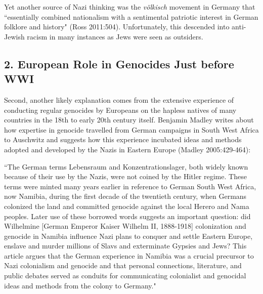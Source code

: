 Yet another source of Nazi thinking was the {\sl völkisch} movement in Germany that ``essentially combined nationalism with a sentimental patriotic interest in German folklore and history" (Ross 2011:504). Unfortunately, this descended into anti-Jewish racism in many instances as Jews were seen as outsiders.
\vskip -20pt

\subsection*{2. European Role in Genocides Just before WWI}
\vskip -4pt

Second, another likely explanation comes from the extensive experience of conducting regular genocides by Europeans on the hapless natives of many countries in the 18th to early 20th century itself. Benjamin Madley writes about how expertise in genocide travelled from German campaigns in South West Africa to Auschwitz and suggests how this experience incubated ideas and methods adopted and developed by the Nazis in Eastern Europe (Madley 2005:429-464):

\begin{myquote}
``The German terms Lebensraum and Konzentrationslager, both widely known because of their use by the Nazis, were not coined by the Hitler regime. These terms were minted many years earlier in reference to German South West Africa, now Namibia, during the first decade of the twentieth century, when Germans colonized the land and committed genocide against the local Herero and Nama peoples. Later use of these borrowed words suggests an important question: did Wilhelmine [German Emperor Kaiser Wilhelm II, 1888-1918] colonization and genocide in Namibia  influence Nazi plans to conquer and settle Eastern Europe, enslave and murder millions of Slavs and exterminate Gypsies and Jews? This article argues that the German experience in Namibia was a crucial precursor to Nazi colonialism and genocide and that personal connections, literature, and public debates served as conduits for communicating colonialist and genocidal ideas and methods from the colony to Germany."
\end{myquote}
\medskip

